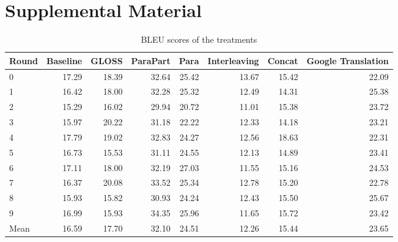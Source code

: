 \documentclass[11pt,a4paper]{article}
\begin{document}
\section{Supplemental Material}
\begin{table}[ht]
\centering
\begin{tabular}{lrrrrrrr}
  \hline
Round & Baseline & GLOSS & ParaPart & Para & Interleaving & Concat & Google Translation \\ 
  \hline
0 & 17.29 & 18.39 & 32.64 & 25.42 & 13.67 & 15.42 & 22.09 \\ 
  1 & 16.42 & 18.00 & 32.28 & 25.32 & 12.49 & 14.31 & 25.38 \\ 
  2 & 15.29 & 16.02 & 29.94 & 20.72 & 11.01 & 15.38 & 23.72 \\ 
  3 & 15.97 & 20.22 & 31.18 & 22.22 & 12.33 & 14.18 & 23.21 \\ 
  4 & 17.79 & 19.02 & 32.83 & 24.27 & 12.56 & 18.63 & 22.31 \\ 
  5 & 16.73 & 15.53 & 31.11 & 24.55 & 12.13 & 14.89 & 23.41 \\ 
  6 & 17.11 & 18.00 & 32.19 & 27.03 & 11.55 & 15.16 & 24.53 \\ 
  7 & 16.37 & 20.08 & 33.52 & 25.34 & 12.78 & 15.20 & 22.78 \\ 
  8 & 15.93 & 15.82 & 30.93 & 24.24 & 12.43 & 15.50 & 25.67 \\ 
  9 & 16.99 & 15.93 & 34.35 & 25.96 & 11.65 & 15.72 & 23.42 \\ 
   \hline
Mean & 16.59 & 17.70 & 32.10 & 24.51 & 12.26 & 15.44 & 23.65 \\ 
   \hline
\end{tabular}
\caption{BLEU scores of the treatments} 
\label{table:complete_table}
\end{table}
\end{document}
